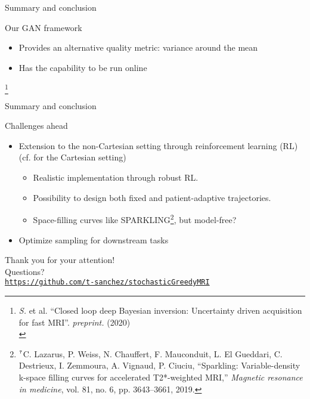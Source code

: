 	
	
\begin{frame}{Summary and conclusion}
\begin{block}{Our GAN framework}
\begin{itemize}
\item Provides an alternative quality metric: variance around the mean 
\item Has the capability to be run online 
\end{itemize}
\end{block}
\let\thefootnote\relax\footnote{\tiny \textit{S.} et al. ``Closed loop deep Bayesian inversion: Uncertainty driven acquisition for fast MRI''. \textit{preprint.} (2020) \\[3mm]}

\end{frame}

\begin{frame}{Summary and conclusion}
\begin{block}{Challenges ahead}
\begin{itemize}
\item Extension to the non-Cartesian setting through reinforcement learning (RL) (cf. \cite{jin2019self} for the Cartesian setting)
\begin{itemize}
\item Realistic implementation through robust RL.
\item Possibility to design both fixed and patient-adaptive trajectories.
\item Space-filling curves like SPARKLING\footnote{$^{\text{\tiny 7}}$\tiny  C. Lazarus, P. Weiss, N. Chauffert, F. Mauconduit,
L. El Gueddari, C. Destrieux, I.  Zemmoura, A. Vignaud, P. Ciuciu, ``Sparkling: Variable-density k-space filling curves for accelerated T2*-weighted MRI,'' \textit {Magnetic resonance in medicine}, vol. 81, no. 6,
pp. 3643--3661, 2019.}, but model-free?
\end{itemize}

\item Optimize sampling for downstream tasks \parencite{weiss2019pilot}
\end{itemize}
\end{block}

\end{frame}





\begin{frame}
        Thank you for your attention!\\[2cm]
        
        Questions?\\[2cm]
        
        \href{https://github.com/t-sanchez/stochasticGreedyMRI}{\normalsize \texttt{https://github.com/t-sanchez/stochasticGreedyMRI}}
    \end{frame}


